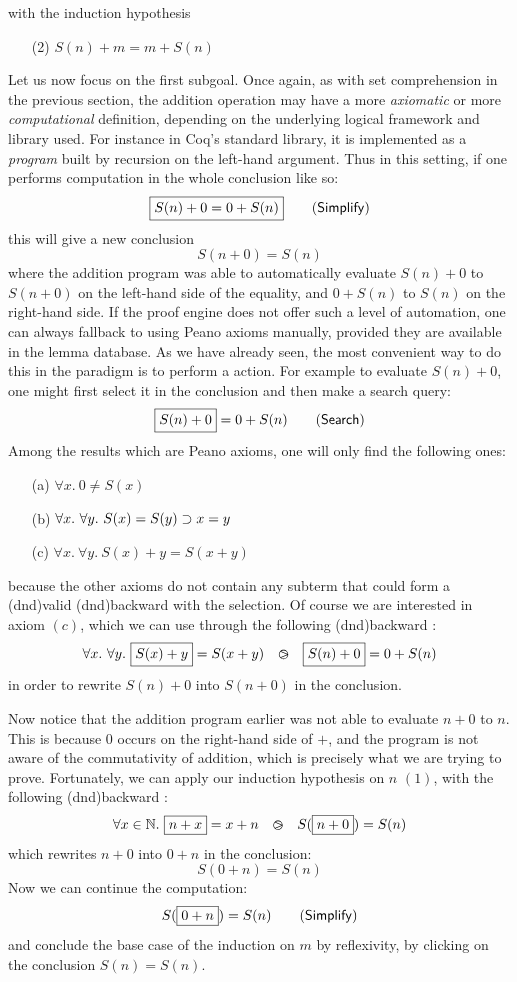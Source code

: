 with the induction hypothesis
\begin{itemize}
  \item[(2)] $S(n) + m = m + S(n)$
\end{itemize}
Let us now focus on the first subgoal. Once again, as with set comprehension in
the previous section, the addition operation may have a more \emph{axiomatic} or
more \emph{computational} definition, depending on the underlying logical
framework and library used. For instance in Coq's standard library, it is
implemented as a \emph{program} built by recursion on the left-hand argument.
Thus in this setting, if one performs computation in the whole conclusion like
so:
$$\fbox{$S(n) + 0 = 0 + S(n)$} \qquad \text{(\textsf{Simplify})}$$
this will give a new conclusion
$$S(n + 0) = S(n)$$
where the addition program was able to automatically evaluate $S(n) + 0$ to $S(n
+ 0)$ on the left-hand side of the equality, and $0 + S(n)$ to $S(n)$ on the
right-hand side. If the proof engine does not offer such a level of automation,
one can always fallback to using Peano axioms manually, provided they are
available in the lemma database. As we have already seen, the most convenient
way to do this in the  paradigm is to perform a 
action. For example to evaluate $S(n) + 0$, one might first select it in the
conclusion and then make a search query:
$$\fbox{$S(n) + 0$} = 0 + S(n) \qquad \text{(\textsf{Search})}$$
Among the results which are Peano axioms, one will only find the following
ones:
\begin{itemize}
  \item[(a)] $\forall x.\ 0 \not= S(x)$
  \item[(b)] $\forall x.\ \forall y.\ S(x) = S(y) \supset x = y$
  \item[(c)] $\forall x.\ \forall y.\ S(x) + y = S(x + y)$
\end{itemize}
because the other axioms do not contain any subterm that could form a
\kl(dnd){valid} \kl(dnd){backward}  with the selection. Of
course we are interested in axiom $(c)$, which we can use through the following
\kl(dnd){backward} :
$$\forall x.\ \forall y.\ \fbox{$S(x) + y$} = S(x + y) ~~\operatorname{\,\varogreaterthan\,}~~ \fbox{$S(n) + 0$} = 0 + S(n)$$
in order to rewrite $S(n) + 0$ into $S(n + 0)$ in the conclusion.

Now notice that the addition program earlier was not able to evaluate $n + 0$ to
$n$. This is because $0$ occurs on the right-hand side of $+$, and the program
is not aware of the commutativity of addition, which is precisely what we are
trying to prove. Fortunately, we can apply our induction hypothesis on $n$
$(1)$, with the following \kl(dnd){backward} :
$$\forall x \in \mathbb{N}.\ \fbox{$n + x$} = x + n ~~\operatorname{\,\varogreaterthan\,}~~ S(\fbox{$n + 0$}) = S(n)$$
which rewrites $n + 0$ into $0 + n$ in the conclusion:
$$S(0 + n) = S(n)$$
Now we can continue the computation:
$$S(\fbox{$0 + n$}) = S(n) \qquad \text{(\textsf{Simplify})}$$
and conclude the base case of the induction on $m$ by reflexivity, by clicking
on the conclusion $S(n) = S(n)$.

